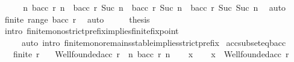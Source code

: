 \begin{isabellebody}
\ \ \isamarkupfalse%
\ \isamarkupfalse%
\ {\isachardoublequoteopen}{\isasymforall}n{\isachardot}{\kern0pt}\ bacc\ r\ n\ {\isacharequal}{\kern0pt}\ bacc\ r\ {\isacharparenleft}{\kern0pt}Suc\ n{\isacharparenright}{\kern0pt}\ {\isasymlongrightarrow}\ bacc\ r\ {\isacharparenleft}{\kern0pt}Suc\ n{\isacharparenright}{\kern0pt}\ {\isacharequal}{\kern0pt}\ bacc\ r\ {\isacharparenleft}{\kern0pt}Suc\ {\isacharparenleft}{\kern0pt}Suc\ n{\isacharparenright}{\kern0pt}{\isacharparenright}{\kern0pt}{\isachardoublequoteclose}\ \isamarkupfalse%
\ auto\isanewline
\ \ \isamarkupfalse%
\ \isamarkupfalse%
\ {\isachardoublequoteopen}finite\ {\isacharparenleft}{\kern0pt}range\ {\isacharparenleft}{\kern0pt}bacc\ r{\isacharparenright}{\kern0pt}{\isacharparenright}{\kern0pt}{\isachardoublequoteclose}\ \isamarkupfalse%
\ auto\isanewline
\ \ \isamarkupfalse%
\ \isamarkupfalse%
\ {\isacharquery}{\kern0pt}thesis\isanewline
\ \ \ \isamarkupfalse%
\ {\isacharparenleft}{\kern0pt}intro\ finite{\isacharunderscore}{\kern0pt}mono{\isacharunderscore}{\kern0pt}strict{\isacharunderscore}{\kern0pt}prefix{\isacharunderscore}{\kern0pt}implies{\isacharunderscore}{\kern0pt}finite{\isacharunderscore}{\kern0pt}fixpoint{\isacharparenright}{\kern0pt}\isanewline
\ \ \ \ \ {\isacharparenleft}{\kern0pt}auto\ intro{\isacharcolon}{\kern0pt}\ finite{\isacharunderscore}{\kern0pt}mono{\isacharunderscore}{\kern0pt}remains{\isacharunderscore}{\kern0pt}stable{\isacharunderscore}{\kern0pt}implies{\isacharunderscore}{\kern0pt}strict{\isacharunderscore}{\kern0pt}prefix{\isacharparenright}{\kern0pt}\isanewline
{}\isamarkupfalse%
%
\endisatagproof
{\isafoldproof}%
%
\isadelimproof
\isanewline
%
\endisadelimproof
\isanewline
{}\isamarkupfalse%
\ acc{\isacharunderscore}{\kern0pt}subseteq{\isacharunderscore}{\kern0pt}bacc{\isacharcolon}{\kern0pt}\isanewline
\ \ \ {\isachardoublequoteopen}finite\ r{\isachardoublequoteclose}\isanewline
\ \ \ {\isachardoublequoteopen}Wellfounded{\isachardot}{\kern0pt}acc\ r\ {\isasymsubseteq}\ {\isacharparenleft}{\kern0pt}{\isasymUnion}n{\isachardot}{\kern0pt}\ bacc\ r\ n{\isacharparenright}{\kern0pt}{\isachardoublequoteclose}\isanewline
%
\isadelimproof
%
\endisadelimproof
%
\isatagproof
{}\isamarkupfalse%
\isanewline
\ \ \isamarkupfalse%
\ x\isanewline
\ \ \isamarkupfalse%
\ {\isachardoublequoteopen}x\ {\isasymin}\ Wellfounded{\isachardot}{\kern0pt}acc\ r{\isachardoublequoteclose}\isanewline

\end{isabellebody}
